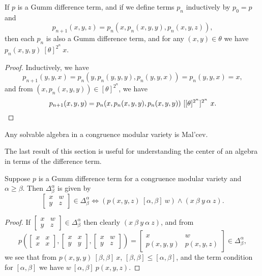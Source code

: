 \begin{appendices}
\begin{prop} If $p$ is a Gumm difference term, and if we define terms $p_n$ inductively by $p_0 = p$ and
\[
p_{n+1}(x,y,z) = p_n(x,p_n(x,y,y),p_n(x,y,z)),
\]
then each $p_n$ is also a Gumm difference term, and for any $(x,y) \in \theta$ we have $p_n(x,y,y)\ [\theta]^{2^n}\ x$.
\end{prop}
\begin{proof} Inductively, we have
\[
p_{n+1}(y,y,x) = p_n(y,p_n(y,y,y),p_n(y,y,x)) = p_n(y,y,x) = x,
\]
and from $(x,p_n(x,y,y)) \in [\theta]^{2^n}$, we have
\[
p_{n+1}(x,y,y) = p_n(x,p_n(x,y,y),p_n(x,y,y))\ [[\theta]^{2^n}]^{2^n}\ x.\qedhere
\]
\end{proof}

\begin{cor}\label{cor-modular-solvable-malcev} Any solvable algebra in a congruence modular variety is Mal'cev.
\end{cor}

The last result of this section is useful for understanding the center of an algebra in terms of the difference term.

\begin{thm}\label{difference-commutator} Suppose $p$ is a Gumm difference term for a congruence modular variety and $\alpha \ge \beta$. Then $\Delta_\beta^\alpha$ is given by
\[
\begin{bmatrix} x & w\\ y & z\end{bmatrix} \in \Delta_\beta^\alpha \iff (p(x,y,z)\ [\alpha,\beta]\ w) \wedge (x\ \beta\ y\ \alpha\ z).
\]
\end{thm}
\begin{proof} If $\begin{bmatrix} x & w\\ y & z\end{bmatrix} \in \Delta_\beta^\alpha$ then clearly $(x\ \beta\ y\ \alpha\ z)$, and from
\[
p\left(\begin{bmatrix} x & x\\ x & x\end{bmatrix}, \begin{bmatrix} x & x\\ y & y\end{bmatrix}, \begin{bmatrix} x & w\\ y & z\end{bmatrix}\right) = \begin{bmatrix} x & w\\ p(x,y,y) & p(x,y,z)\end{bmatrix} \in \Delta_\beta^\alpha,
\]
we see that from $p(x,y,y)\ [\beta,\beta]\ x$, $[\beta,\beta] \le [\alpha,\beta]$, and the term condition for $[\alpha,\beta]$ we have $w\ [\alpha,\beta]\ p(x,y,z)$.


\end{proof}
\end{appendices}
